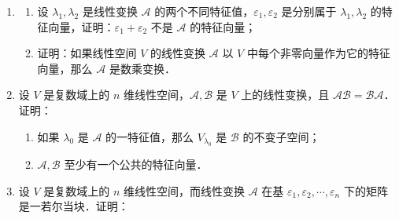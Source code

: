 \begin{enumerate}
  \[
    A=\begin{pmatrix}
      5&-2&-4&3\\
      3&-1&-3&2\\
      -3&\frac{1}{2}&\frac{9}{2}&-\frac{5}{2}\\
      -10&3&11&-7
    \end{pmatrix}.
  \]
  \begin{enumerate}
    \item 求 $\mathcal{A}$ 在基
    \[
      \begin{gathered}
        \eta_1=\varepsilon_1+2\varepsilon_2+\varepsilon_3+\varepsilon_4,\\
        \eta_2=2\varepsilon_1+3\varepsilon_2+\varepsilon_3,\\
        \eta_3=\varepsilon_3,\\
        \eta_4=\varepsilon_4
      \end{gathered}
    \]
    下的矩阵；
  \anssub
    \item 求 $\mathcal{A}$ 的特征值与特征向量；
  \anssub
    \item 求一可逆矩阵 $T$，使 $T^{-1}AT$ 成对角形．
  \anssub
  \end{enumerate}
  \item
  \begin{enumerate}
    \item 设 $\lambda_1,\lambda_2$ 是线性变换 $\mathcal{A}$ 的两个不同特征值，$\varepsilon_1,\varepsilon_2$ 是分别属于 $\lambda_1,\lambda_2$ 的特征向量，证明：$\varepsilon_1+\varepsilon_2$ 不是 $\mathcal{A}$ 的特征向量；
  \anssub
    \item 证明：如果线性空间 $V$ 的线性变换 $\mathcal{A}$ 以 $V$ 中每个非零向量作为它的特征向量，那么 $\mathcal{A}$ 是数乘变换．
  \anssub
  \end{enumerate}
  \item 设 $V$ 是复数域上的 $n$ 维线性空间，$\mathcal{A},\mathcal{B}$ 是 $V$ 上的线性变换，且 $\mathcal{A}\mathcal{B}=\mathcal{B}\mathcal{A}$．证明：
  \begin{enumerate}
    \item 如果 $\lambda_0$ 是 $\mathcal{A}$ 的一特征值，那么 $V_{\lambda_0}$ 是 $\mathcal{B}$ 的不变子空间；
  \anssub
    \item $\mathcal{A},\mathcal{B}$ 至少有一个公共的特征向量．
  \anssub
  \end{enumerate}
  \item 设 $V$ 是复数域上的 $n$ 维线性空间，而线性变换 $\mathcal{A}$ 在基 $\varepsilon_1,\varepsilon_2,\cdots,\varepsilon_n$ 下的矩阵是一若尔当块．证明：

\end{enumerate}
